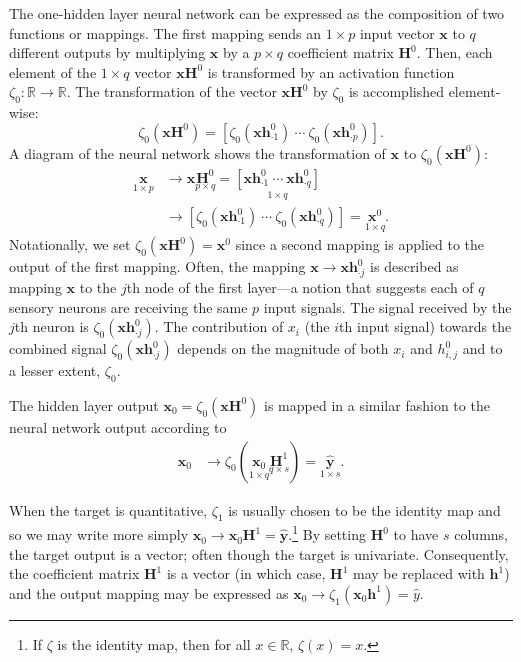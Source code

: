 \documentclass[graybox,envcountchap]{svmono}
\newcommand{\hf}{\mathbf{h}}
\newcommand{\Hf}{\mathbf{H}}
\newcommand{\xf}{\mathbf{x}}
\newcommand{\yf}{\mathbf{y}}
\newcommand{\nn}{neural network}
\newcommand{\w}{\widehat}
\begin{document}
The one-hidden layer \nn{ can} be expressed as the composition of two functions or mappings.  The first mapping sends an $1 \times p$ input vector $\xf$ to $q$ different outputs by multiplying $\xf$ by a $p \times q$ coefficient matrix $\Hf^0$. Then, each element of the $1 \times q$ vector $\xf\Hf^0$ is transformed by an activation function $\zeta_0:\mathbb{R} \rightarrow \mathbb{R}$. The transformation of the vector $\xf\Hf^0$ by $\zeta_0$ is accomplished element-wise:
\begin{equation*}
\zeta_0(\xf\Hf^0) = [\zeta_0(\xf\hf^0_{\cdot 1}) \ \cdots \ \zeta_0(\xf\hf^0_{\cdot p})].
\end{equation*}
A diagram of the {\nn } shows the transformation of $\xf$ to  $\zeta_0(\xf\Hf^0)$:
\begin{equation*}
\begin{aligned}
 \underset{1 \times p}{\xf} &\longrightarrow \xf \underset{p \times q}{\Hf^0} 
  = \underset{1 \times q}{\left[\xf\hf_{\cdot 1}^0 \ \cdots \ \xf\hf_{\cdot q}^0\right]}\\
   &\longrightarrow  \left[\zeta_0(\xf\hf_{\cdot 1}^0) \ \cdots \ \zeta_0(\xf\hf_{\cdot q}^0)\right]= \underset{1 \times q}{\xf^0}.
\end{aligned}
\end{equation*}
Notationally, we set $\zeta_0(\xf\Hf^0) ={\xf^0}$ since a second mapping is applied to the output of the first mapping.
Often, the mapping $\xf \rightarrow \xf\hf^0_{\cdot j}$ is described as mapping $\xf$ to the $j$th node of the first layer---a notion that suggests each of $q$ sensory neurons are receiving the same $p$ input signals. The signal received by the $j$th neuron is $\zeta_0(\xf\hf^0_{\cdot j})$. The contribution of $x_i$ (the $i$th input signal) towards the combined signal $\zeta_0(\xf\hf_{\cdot j}^0)$ depends on the magnitude of both $x_i$ and $h_{i,j}^0$ and to a lesser extent, $\zeta_0$.

The hidden layer output  $\xf_0 = \zeta_0(\xf\Hf^0)$ is mapped in a similar fashion to the {\nn } output according to
\begin{equation*}
\begin{aligned}
 {\xf_0} &\longrightarrow \zeta_0(\underset{1 \times q}{\xf_0} \underset{q \times s}{\Hf^1} )
  = \underset{1 \times s}{\w{\yf}}.
\end{aligned}
\end{equation*}

When the target is quantitative, $\zeta_1$ is usually chosen to be the identity map and so we may write more simply 
${\xf_0} \rightarrow {\xf_0} {\Hf^1} = \w{\yf} $.\footnote{If $\zeta$ is the identity map, then for all $x \in \mathbb{R}$, $\zeta(x) = x$.}  By setting $\Hf^0$ to have $s$ columns, the target output is a vector; often though the target is univariate. Consequently, the coefficient matrix $\Hf^1$ is a vector (in which case, $\Hf^1$ may be replaced  with $\hf^1$) and the output mapping may be expressed as ${\xf_0} \rightarrow \zeta_1({\xf_0\hf^1} ) = \w{y}$.
\end{document}
